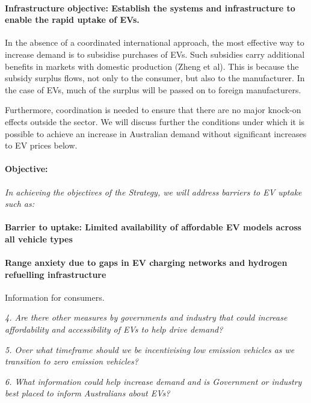 \documentclass[12pt, draft]{article} \usepackage[shortlabels]{enumitem}
\begin{document}
\paragraph{Infrastructure objective: Establish the systems and infrastructure
to enable the rapid uptake of EVs.}


In the absence of a coordinated international approach, the most effective way
to increase demand is to subsidise purchases of EVs.  Such subsidies carry
additional benefits in markets with domestic production (Zheng et al). This is
because the subsidy surplus flows, not only to the consumer, but also to the
manufacturer. In the case of EVs, much of the surplus will be passed on to
foreign manufacturers.


Furthermore, coordination is needed to ensure that there are no
major knock-on effects outside the sector. We will discuss further the
conditions under which it is possible to achieve an increase in Australian
demand without significant increases to EV prices below.

\paragraph{Objective:
    }




\emph{In achieving the objectives of the Strategy, we will address barriers to EV
uptake such as:
}

\paragraph{Barrier to uptake: Limited availability of affordable EV models
across all vehicle types}

\paragraph{Range anxiety due to gaps in EV charging networks and hydrogen
refuelling infrastructure }

Information for consumers.

\emph{4. Are there other measures by governments and industry that could increase
affordability and accessibility of EVs to help drive demand?}

\emph{5. Over what timeframe should we be incentivising low emission vehicles
as we transition to zero emission vehicles?}

\emph{6. What information could help increase demand and is Government or industry
best placed to inform Australians about EVs?}
\end{document}
